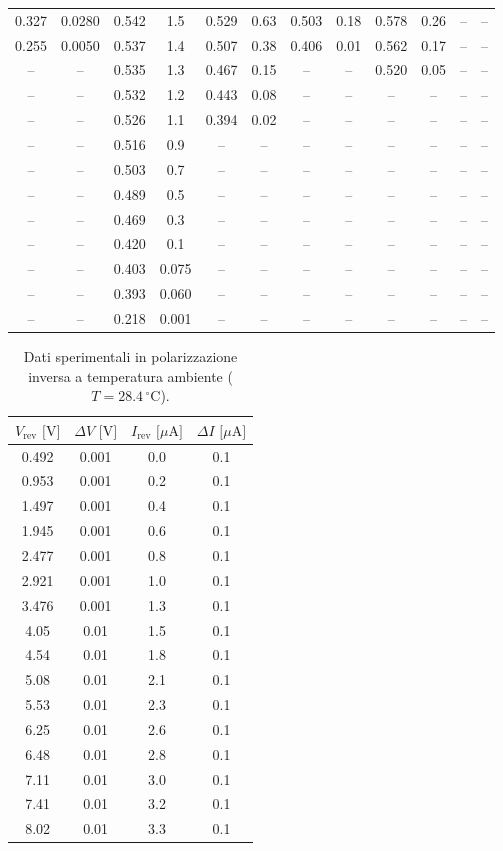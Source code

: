 \documentclass[a4paper,11pt]{article}
\begin{document}
\begin{table}[H]
{\begin{tabular}{|cc|cc|cc|cc|cc|cc|}
0.327 & 0.0280 & 0.542 & 1.5 & 0.529 & 0.63 & 0.503 & 0.18 & 0.578 & 0.26 & -- & -- \\
0.255 & 0.0050 & 0.537 & 1.4 & 0.507 & 0.38 & 0.406 & 0.01 & 0.562 & 0.17 & -- & -- \\
-- & -- & 0.535 & 1.3 & 0.467 & 0.15 & -- & -- & 0.520 & 0.05 & -- & -- \\
-- & -- & 0.532 & 1.2 & 0.443 & 0.08 & -- & -- & -- & -- & -- & -- \\
-- & -- & 0.526 & 1.1 & 0.394 & 0.02 & -- & -- & -- & -- & -- & -- \\
-- & -- & 0.516 & 0.9 & -- & -- & -- & -- & -- & -- & -- & -- \\
-- & -- & 0.503 & 0.7 & -- & -- & -- & -- & -- & -- & -- & -- \\
-- & -- & 0.489 & 0.5 & -- & -- & -- & -- & -- & -- & -- & -- \\
-- & -- & 0.469 & 0.3 & -- & -- & -- & -- & -- & -- & -- & -- \\
-- & -- & 0.420 & 0.1 & -- & -- & -- & -- & -- & -- & -- & -- \\
-- & -- & 0.403 & 0.075 & -- & -- & -- & -- & -- & -- & -- & -- \\
-- & -- & 0.393 & 0.060 & -- & -- & -- & -- & -- & -- & -- & -- \\
-- & -- & 0.218 & 0.001 & -- & -- & -- & -- & -- & -- & -- & -- \\
\hline
\end{tabular}%
}
\end{table}


\begin{table}[H]
\centering
\caption{Dati sperimentali in polarizzazione inversa a temperatura ambiente ($T = 28.4\,^\circ\text{C}$).}
\label{tab:dati_inversa}
\begin{tabular}{|c|c|c|c|}
\hline
$V_{\text{rev}}\text{ [V]}$ & $\Delta V\text{ [V]}$ & $I_{\text{rev}}\text{ [}\mu\text{A]}$ & $\Delta I\text{ [}\mu\text{A]}$ \\
\hline
0.492 & 0.001 & 0.0 & 0.1 \\
0.953 & 0.001 & 0.2 & 0.1 \\
1.497 & 0.001 & 0.4 & 0.1 \\
1.945 & 0.001 & 0.6 & 0.1 \\
2.477 & 0.001 & 0.8 & 0.1 \\
2.921 & 0.001 & 1.0 & 0.1 \\
3.476 & 0.001 & 1.3 & 0.1 \\
4.05  & 0.01  & 1.5 & 0.1 \\
4.54  & 0.01  & 1.8 & 0.1 \\
5.08  & 0.01  & 2.1 & 0.1 \\
5.53  & 0.01  & 2.3 & 0.1 \\
6.25  & 0.01  & 2.6 & 0.1 \\
6.48  & 0.01  & 2.8 & 0.1 \\
7.11  & 0.01  & 3.0 & 0.1 \\
7.41  & 0.01  & 3.2 & 0.1 \\
8.02  & 0.01  & 3.3 & 0.1 \\
\hline
\end{tabular}
\end{table}
\end{document}

